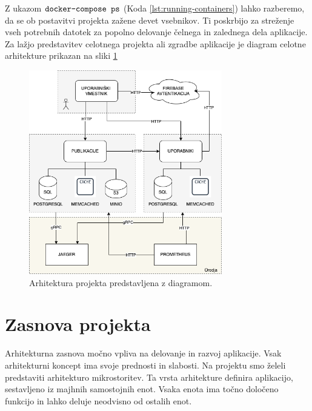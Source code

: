 \documentclass[a4paper, 12pt]{book}
\begin{document}
Z ukazom $\verb=docker-compose ps=$ (Koda \ref{lst:running-containers}) lahko razberemo, da se ob postavitvi projekta zažene devet vsebnikov. Ti poskrbijo za streženje vseh potrebnih datotek za popolno delovanje čelnega in zalednega dela aplikacije. Za lažjo predstavitev celotnega projekta ali zgradbe aplikacije je diagram celotne arhitekture prikazan na sliki \ref{final-arch}

\begin{figure}[h]
\begin{center}
\includegraphics[width=0.75\textwidth]{slike/arch-done.png}
\end{center}
\caption{ Arhitektura projekta predstavljena z diagramom. }
\label{final-arch}
\end{figure}



\section{Zasnova projekta}
Arhitekturna zasnova močno vpliva na delovanje in razvoj aplikacije. Vsak arhitekturni koncept ima svoje prednosti in slabosti. Na projektu smo želeli predstaviti arhitekturo mikrostoritev. Ta vrsta arhitekture definira aplikacijo, sestavljeno iz majhnih samostojnih enot. Vsaka enota ima točno določeno funkcijo in lahko deluje neodvisno od ostalih enot.
\end{document}

